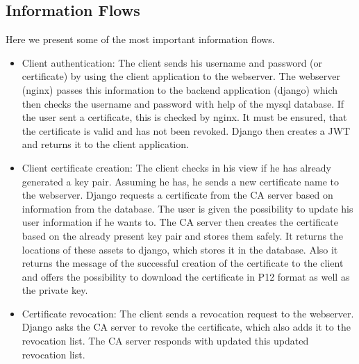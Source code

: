 \documentclass[english]{article}
\begin{document}
\subsection{Information Flows}

Here we present some of the most important information flows.

\begin{itemize}
	\item Client authentication: The client sends his username and password (or certificate) by using the client application to the webserver. The webserver (nginx) passes this information to the backend application (django) which then checks the username and password with help of the mysql database. If the user sent a certificate, this is checked by nginx. It must be ensured, that the certificate is valid and has not been revoked. Django then creates a JWT and returns it to the client application.
	
	\item Client certificate creation: The client checks in his view if he has already generated a key pair. Assuming he has, he sends a new certificate name to the webserver. Django requests a certificate from the CA server based on information from the database. The user is given the possibility to update his user information if he wants to. The CA server then creates the certificate based on the already present key pair and stores them safely. It returns the locations of these assets to django, which stores it in the database. Also it returns the message of the successful creation of the certificate to the client and offers the possibility to download the certificate in P12 format as well as the private key.
	
	\item Certificate revocation: The client sends a revocation request to the webserver. Django asks the CA server to revoke the certificate, which also adds it to the revocation list. The CA server responds with updated this updated revocation list.
\end{itemize}

\end{document}
